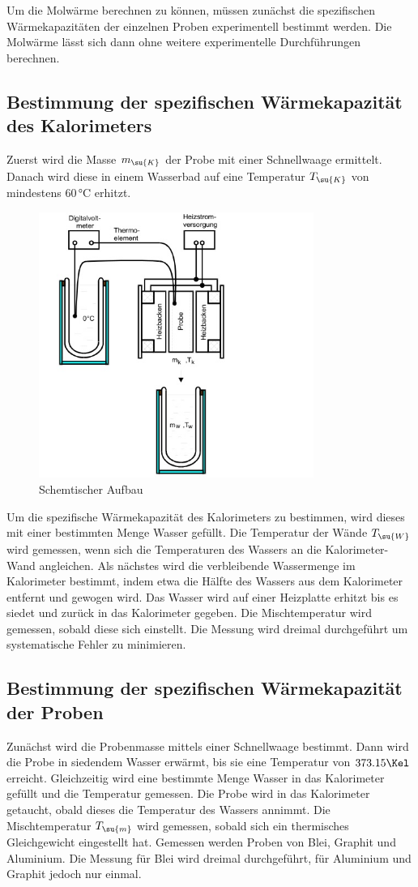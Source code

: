Um die Molwärme berechnen zu können, müssen zunächst die spezifischen
Wärmekapazitäten der einzelnen Proben experimentell bestimmt werden.
Die Molwärme lässt sich dann ohne weitere experimentelle Durchführungen
berechnen.
\subsection{Bestimmung der spezifischen Wärmekapazität des Kalorimeters}
Zuerst wird die Masse $m_\su{K}$ der Probe mit einer Schnellwaage ermittelt.
Danach wird diese in einem Wasserbad auf eine Temperatur $T_\su{K}$ von
mindestens $60\,\si{\celsius}$ erhitzt.
\begin{figure}
  \centering
  \includegraphics[width=0.8\textwidth]{bilder/aufbau.jpg}
  \caption{Schemtischer Aufbau}
  \label{aufbau}
\end{figure}
Um die spezifische Wärmekapazität des Kalorimeters zu bestimmen, wird dieses
mit einer bestimmten Menge Wasser gefüllt. Die Temperatur der Wände $T_\su{W}$
wird gemessen, wenn sich die Temperaturen des Wassers an die Kalorimeter-Wand
angleichen. Als nächstes wird die verbleibende Wassermenge im Kalorimeter
bestimmt, indem etwa die Hälfte des Wassers aus dem Kalorimeter entfernt und
gewogen wird. Das Wasser wird auf einer Heizplatte erhitzt bis es siedet und
zurück in das Kalorimeter gegeben. Die Mischtemperatur wird gemessen, sobald
diese sich einstellt. Die Messung wird dreimal durchgeführt um systematische
Fehler zu minimieren.
\subsection{Bestimmung der spezifischen Wärmekapazität der Proben}
Zunächst wird die Probenmasse mittels einer Schnellwaage bestimmt. Dann wird die
Probe in siedendem Wasser erwärmt, bis sie eine Temperatur von $373.15\Kel$
erreicht. Gleichzeitig wird eine bestimmte Menge Wasser in das Kalorimeter
gefüllt und die Temperatur gemessen. Die Probe wird in das Kalorimeter getaucht,
obald dieses die Temperatur des Wassers annimmt. Die Mischtemperatur $T_\su{m}$
wird gemessen, sobald sich ein thermisches Gleichgewicht eingestellt hat.
Gemessen werden Proben von Blei, Graphit und Aluminium. Die Messung für Blei
wird dreimal durchgeführt, für Aluminium und Graphit jedoch nur einmal.
